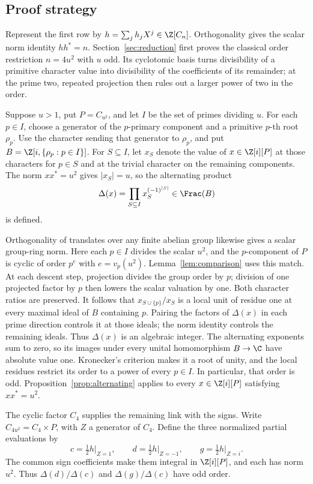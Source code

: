\subsection*{Proof strategy}

Represent the first row by \(h=\sum_jh_jX^j\in\Z[C_n]\).
Orthogonality gives the scalar norm identity \(hh^*=n\).
Section~\ref{sec:reduction} first proves the classical order
restriction \(n=4u^2\) with \(u\) odd. Its cyclotomic basis turns
divisibility of a primitive character value into divisibility of
the coefficients of its remainder; at the prime two, repeated
projection then rules out a larger power of two in the order.

Suppose \(u>1\), put \(P=C_{u^2}\), and let \(I\) be the set of primes
dividing \(u\). For each \(p\in I\), choose a generator of the
\(p\)-primary component and a primitive \(p\)-th root \(\rho_p\).
Use the character sending that generator to \(\rho_p\), and put
\(B=\Z[i,\{\rho_p:p\in I\}]\). For \(S\subseteq I\), let \(x_S\)
denote the value of \(x\in\Z[i][P]\) at those characters for
\(p\in S\) and at the trivial character on the remaining components.
The norm \(xx^*=u^2\) gives \(|x_S|=u\), so the alternating product
\[
 \Delta(x)=\prod_{S\subseteq I}x_S^{(-1)^{|S|}}\in\Frac(B)
\]
is defined.

Orthogonality of translates over any finite abelian group likewise gives
a scalar group-ring norm. Here each \(p\in I\)
divides the scalar \(u^2\), and the \(p\)-component of \(P\) is cyclic
of order \(p^e\) with \(e=v_p(u^2)\). Lemma~\ref{lem:comparison}
uses this match. At each descent step, projection divides the group
order by \(p\); division of one projected factor by \(p\) then lowers
the scalar valuation by one. Both character ratios are preserved.
It follows that
\(x_{S\cup\{p\}}/x_S\) is a local unit of residue one at every maximal
ideal of \(B\) containing \(p\). Pairing the factors of \(\Delta(x)\)
in each prime direction controls it at those ideals; the norm identity
controls the remaining ideals. Thus \(\Delta(x)\) is an algebraic
integer. The alternating exponents sum to zero, so its images under
every unital homomorphism \(B\to\C\) have absolute value one.
Kronecker's criterion makes it a root of unity, and the local residues
restrict its order to a power of every \(p\in I\). In particular, that
order is odd. Proposition~\ref{prop:alternating} applies to every
\(x\in\Z[i][P]\) satisfying \(xx^*=u^2\).

The cyclic factor \(C_4\) supplies the remaining link with the signs. Write
\(C_{4u^2}=C_4\times P\), with \(Z\) a generator of \(C_4\).
Define the three normalized partial evaluations by
\[
 c=\tfrac12h\vert_{Z=1},\qquad
 d=\tfrac12h\vert_{Z=-1},\qquad
 g=\tfrac12h\vert_{Z=i}.
\]
The common sign coefficients make them integral in \(\Z[i][P]\),
and each has norm \(u^2\). Thus
\(\Delta(d)/\Delta(c)\) and \(\Delta(g)/\Delta(c)\) have odd order.

